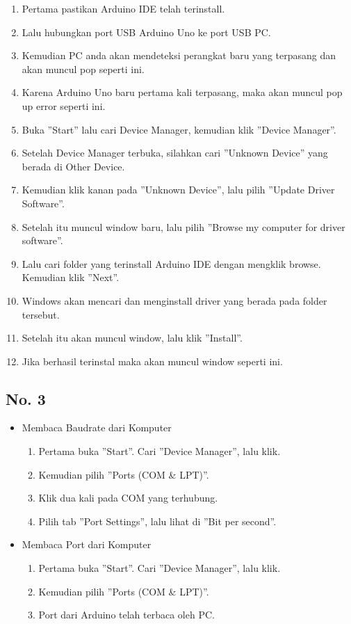 	\begin{enumerate}
		\item Pertama pastikan Arduino IDE telah terinstall.
		\item Lalu hubungkan port USB Arduino Uno ke port USB PC.
		\item Kemudian PC anda akan mendeteksi perangkat baru yang terpasang dan akan muncul pop seperti ini.
		\item Karena Arduino Uno baru pertama kali terpasang, maka akan muncul pop up error seperti ini.
		\item Buka ''Start'' lalu cari Device Manager, kemudian klik ''Device Manager''.
		\item Setelah Device Manager terbuka, silahkan cari ''Unknown Device'' yang berada di Other Device.
		\item Kemudian klik kanan pada ''Unknown Device'', lalu pilih ''Update Driver Software''.
		\item Setelah itu muncul window baru, lalu pilih ''Browse my computer for driver software''.
		\item Lalu cari folder yang terinstall Arduino IDE dengan mengklik browse. Kemudian klik ''Next''.
		\item Windows akan mencari dan menginstall driver yang berada pada folder tersebut.
		\item Setelah itu akan muncul window, lalu klik ''Install''.
		\item Jika berhasil terinstal maka akan muncul window seperti ini.
	\end{enumerate}

\subsection{No. 3}
	\begin{itemize}
		\item Membaca Baudrate dari Komputer
			\begin{enumerate}
				\item Pertama buka ''Start''. Cari ''Device Manager'', lalu klik.
				\item Kemudian pilih ''Ports (COM \& LPT)''.
				\item Klik dua kali pada COM yang terhubung.
				\item Pilih tab ''Port Settings'', lalu lihat di ''Bit per second''.
			\end{enumerate}
		\item Membaca Port dari Komputer
			\begin{enumerate}
				\item Pertama buka ''Start''. Cari ''Device Manager'', lalu klik.
				\item Kemudian pilih ''Ports (COM \& LPT)''.
				\item Port dari Arduino telah terbaca oleh PC.
			\end{enumerate}
	\end{itemize}
	
